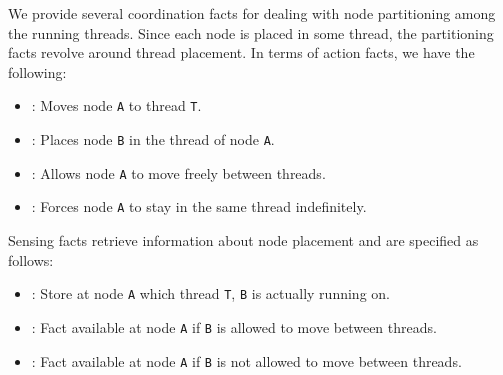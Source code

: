 
We provide several coordination facts for dealing with node partitioning among
the running threads. Since each node is placed in some thread, the partitioning
facts revolve around thread placement.  In terms of action facts, we have the
following:

\begin{itemize}
   \item {}: Moves node \texttt{A} to thread
   \texttt{T}.

   \item {}: Places node \texttt{B} in
   the thread of node \texttt{A}.

   \item {}: Allows node \texttt{A} to move freely
   between threads.

   \item {}: Forces node \texttt{A} to stay in the
   same thread indefinitely.

\end{itemize}

Sensing facts retrieve information about node placement and are specified as
follows:

\begin{itemize}

   \item {}: Store at node \texttt{A} which
      thread \texttt{T}, \texttt{B} is actually running on.

   \item {}: Fact available at node \texttt{A} if
      \texttt{B} is allowed to move between threads.

   \item {}: Fact available at node \texttt{A} if
      \texttt{B} is not allowed to move between threads.

\end{itemize}

